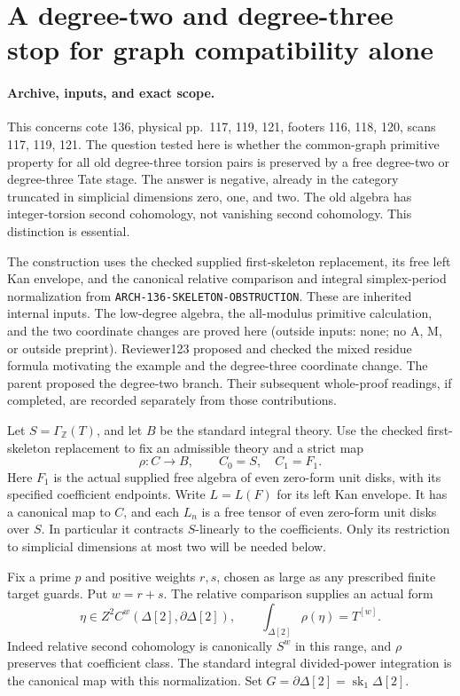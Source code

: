 \section{A degree-two and degree-three stop for graph compatibility alone}
\label{sec:136-low-tate-compatibility-obstruction}

\paragraph{Archive, inputs, and exact scope.}
This concerns cote 136, physical pp.~117, 119, 121, footers
116, 118, 120, scans 117, 119, 121.  The question tested here
is whether the common-graph primitive property for all old
degree-three torsion pairs is preserved by a free degree-two
or degree-three Tate stage.  The answer is negative, already
in the category truncated in simplicial dimensions zero, one,
and two.  The old algebra has integer-torsion second cohomology,
not vanishing second cohomology.  This distinction is essential.

The construction uses the checked supplied first-skeleton
replacement, its free left Kan envelope, and the canonical
relative comparison and integral simplex-period normalization
from \nolinkurl{ARCH-136-SKELETON-OBSTRUCTION}.  These are
inherited internal inputs.  The low-degree algebra, the
all-modulus primitive calculation, and the two coordinate
changes are proved here (outside inputs: none; no A, M, or
outside preprint).  Reviewer123 proposed and checked the mixed
residue formula motivating the example and the degree-three
coordinate change.  The parent proposed the degree-two branch.
Their subsequent whole-proof readings, if completed, are recorded
separately from those contributions.

Let \(S=\Gamma_{\mathbb Z}(T)\), and let \(B\) be the
standard integral theory.  Use the checked first-skeleton
replacement to fix an admissible theory and a strict map
\[
 \rho:C\longrightarrow B,\qquad C_0=S,\quad C_1=F_1.
                                                        \tag{136.LTQ1}
\]
Here \(F_1\) is the actual supplied free algebra of even
zero-form unit disks, with its specified coefficient endpoints.
Write \(L=L(F)\) for its left Kan envelope.  It has a
canonical map to \(C\), and each \(L_n\) is a free
tensor of even zero-form unit disks over \(S\).  In
particular it contracts \(S\)-linearly to the coefficients.
Only its restriction to simplicial dimensions at most two will
be needed below.

Fix a prime \(p\) and positive weights \(r,s\), chosen
as large as any prescribed finite target guards.  Put
\(w=r+s\).  The relative comparison supplies an actual form
\[
 \eta\in Z^2 C^{w}(\Delta[2],\partial\Delta[2]),
          \qquad \int_{\Delta[2]}\rho(\eta)=T^{[w]}.
                                                        \tag{136.LTQ2}
\]
Indeed relative second cohomology is canonically \(S^w\)
in this range, and \(\rho\) preserves that coefficient
class.  The standard integral divided-power integration is
the canonical map with this normalization.  Set
\(G=\partial\Delta[2]=\operatorname{sk}_1\Delta[2]\).

